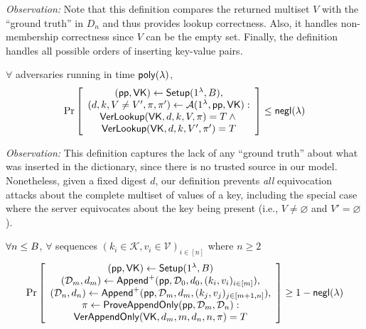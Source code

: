 \noindent \textit{Observation:}
Note that this definition compares the returned multiset $V$ with the ``ground truth'' in $D_n$ and thus provides lookup correctness.
Also, it handles non-membership correctness since $V$ can be the empty set.
Finally, the definition handles all possible orders of inserting key-value pairs.

\begin{definition}
\label{def:aad:lookup-security}
$\forall$ adversaries \Adv running in time $\mathsf{poly}(\lambda)$,
\begin{align*}
\Pr \left[ \begin{array}{c}
    (\mathsf{pp},\mathsf{VK}) \leftarrow \mathsf{Setup}(1^\lambda, B), \\
    (d, k,V\ne V',\pi,\pi') \leftarrow \mathcal{A}(1^\lambda, \mathsf{pp}, \mathsf{VK})
    : \\
    {\mathsf{VerLookup}(\mathsf{VK},d, k,V,\pi) = T} \wedge {} \\
    {\mathsf{VerLookup}(\mathsf{VK},d, k,V',\pi') = T}
\end{array} \right] \le \mathsf{negl}(\lambda)
\end{align*}
\end{definition}

\noindent \textit{Observation:}
This definition captures the lack of any ``ground truth'' about what was inserted in the dictionary, since there is no trusted source in our model.
Nonetheless, given a fixed digest $d$, our definition prevents \textit{all} equivocation attacks about the complete multiset of values of a key, including the special case where the server equivocates about the key being present (i.e., $V \ne \varnothing$ and $V' = \varnothing$).

\begin{definition}
\label{def:aad:appendonly-correctness}
$\forall n \le B$, $\forall$ sequences $(k_i\in \mathcal{K}, v_i\in\mathcal{V})_{i\in [n]}$ where $n\ge 2$
\begin{align*}
\Pr \left[ \begin{array}{c}
    (\mathsf{pp},\mathsf{VK}) \leftarrow \mathsf{Setup}(1^\lambda, B) \\
    (\mathcal{D}_m, d_m) \leftarrow \mathsf{Append}^{+}(\mathsf{pp},\mathcal{D}_0,d_0,(k_i, v_i)_{i\in [m]}),\\
    (\mathcal{D}_n, d_n) \leftarrow \mathsf{Append}^{+}(\mathsf{pp},\mathcal{D}_m,d_m,(k_j, v_j)_{j\in [m+1,n]}),  \\
    \pi \leftarrow \mathsf{ProveAppendOnly}(\mathsf{pp},\mathcal{D}_m, \mathcal{D}_n):\\
    {\mathsf{VerAppendOnly}(\mathsf{VK}, d_m, m, d_n, n, \pi) = T}
\end{array} \right] \ge 1 - \mathsf{negl}(\lambda)
\end{align*}
\end{definition}

